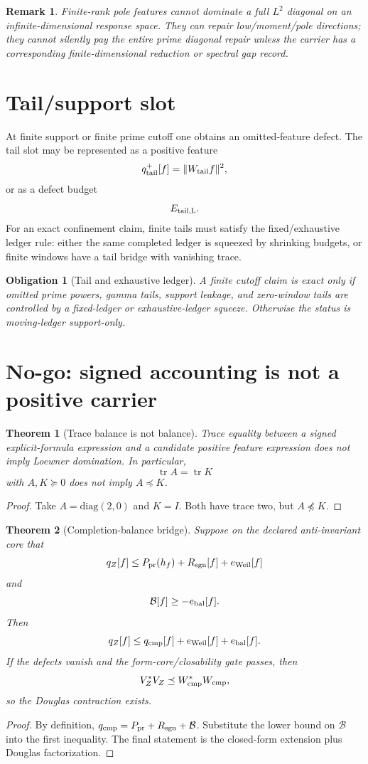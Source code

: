 \documentclass[11pt]{article}
\newtheorem{theorem}{Theorem}
\newtheorem{remark}{Remark}
\newtheorem{obligation}{Obligation}
\begin{document}
\begin{remark}
Finite-rank pole features cannot dominate a full \(L^2\) diagonal on an infinite-dimensional response space.  They can repair low/moment/pole directions; they cannot silently pay the entire prime diagonal repair unless the carrier has a corresponding finite-dimensional reduction or spectral gap record.
\end{remark}

\section{Tail/support slot}
At finite support or finite prime cutoff one obtains an omitted-feature defect.  The tail slot may be represented as a positive feature
\[
  q_{\rm tail}^+[f]=\|W_{\rm tail}f\|^2,
\]
or as a defect budget
\[
  E_{\rm tail,L}.
\]
For an exact confinement claim, finite tails must satisfy the fixed/exhaustive ledger rule: either the same completed ledger is squeezed by shrinking budgets, or finite windows have a tail bridge with vanishing trace.

\begin{obligation}[Tail and exhaustive ledger]
A finite cutoff claim is exact only if omitted prime powers, gamma tails, support leakage, and zero-window tails are controlled by a fixed-ledger or exhaustive-ledger squeeze.  Otherwise the status is moving-ledger support-only.
\end{obligation}

\section{No-go: signed accounting is not a positive carrier}
\begin{theorem}[Trace balance is not balance]
Trace equality between a signed explicit-formula expression and a candidate positive feature expression does not imply Loewner domination.  In particular,
\[
  \operatorname{tr} A=\operatorname{tr} K
\]
with \(A,K\succeq0\) does not imply \(A\preceq K\).
\end{theorem}
\begin{proof}
Take \(A=\mathrm{diag}(2,0)\) and \(K=I\).  Both have trace two, but \(A\npreceq K\).
\end{proof}

\begin{theorem}[Completion-balance bridge]
Suppose on the declared anti-invariant core that
\[
  q_Z[f]\le P_{\rm pr}(h_f)+R_{\rm sgn}[f]+e_{\rm Weil}[f]
\]
and
\[
  \mathcal B[f]\ge -e_{\rm bal}[f].
\]
Then
\[
  q_Z[f]\le q_{\rm cmp}[f]+e_{\rm Weil}[f]+e_{\rm bal}[f].
\]
If the defects vanish and the form-core/closability gate passes, then
\[
  V_Z^*V_Z\preceq W_{\rm cmp}^*W_{\rm cmp},
\]
so the Douglas contraction exists.
\end{theorem}
\begin{proof}
By definition, \(q_{\rm cmp}=P_{\rm pr}+R_{\rm sgn}+\mathcal B\).  Substitute the lower bound on \(\mathcal B\) into the first inequality.  The final statement is the closed-form extension plus Douglas factorization.
\end{proof}
\end{document}
